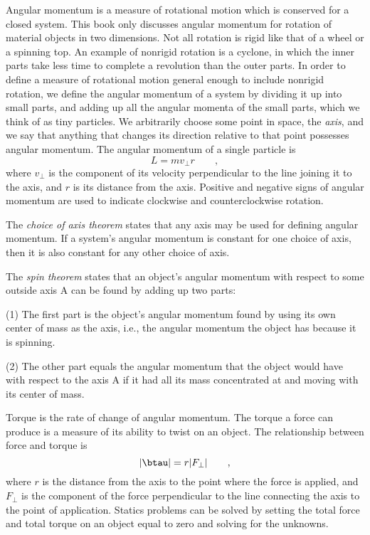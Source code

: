 \begin{summary}
\begin{summarytext}

Angular momentum is a measure of rotational motion which is
conserved for a closed system. This book only discusses
angular momentum for rotation of material objects in two
dimensions. Not all rotation is rigid like that of a wheel
or a spinning top. An example of nonrigid rotation is a
cyclone, in which the inner parts take less time to complete
a revolution than the outer parts. In order to define a
measure of rotational motion general enough to include
nonrigid rotation, we define the angular momentum of a
system by dividing it up into small parts, and adding up all
the angular momenta of the small parts, which we think of as
tiny particles. We arbitrarily choose some point in space,
the \emph{axis}, and we say that anything that changes its
direction relative to that point possesses angular momentum.
The angular momentum of a single particle is
\begin{equation*}
                L  =  mv_{\perp}r   \qquad   ,
\end{equation*}
where $v_{\perp}$ is the component of its velocity perpendicular to
the line joining it to the axis, and $r$ is its distance
from the axis. Positive and negative signs of angular
momentum are used to indicate clockwise and counterclockwise rotation.

The \emph{choice of axis theorem} states that any axis may
be used for defining angular momentum. If a system's angular
momentum is constant for one choice of axis, then it is also
constant for any other choice of axis.

The \emph{spin theorem} states that an object's angular
momentum with respect to some outside axis A can be found by
adding up two parts:

(1) The first part is the object's angular momentum found by
using its own center of mass as the axis, i.e., the angular
momentum the object has because it is spinning.

(2) The other part equals the angular momentum that the
object would have with respect to the axis A if it had all
its mass concentrated at and moving with its center of mass.

Torque is the rate of change of angular momentum. The torque
a force can produce is a measure of its ability to twist on
an object. The relationship between force and torque is
\begin{equation*}
                |\btau |    =    r |F_{\perp} |   \qquad   ,
\end{equation*}
where $r$ is the distance from the axis to the point where
the force is applied, and $F_{\perp}$ is the component of the force
perpendicular to the line connecting the axis to the point
of application. Statics problems can be solved by setting
the total force and total torque on an object equal to zero
and solving for the unknowns.


\end{summarytext}
\end{summary}
